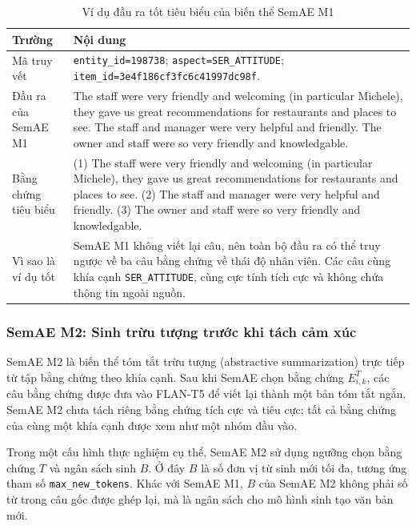 \begin{table}[H]
\centering
\caption{Ví dụ đầu ra tốt tiêu biểu của biến thể SemAE M1}
\label{tab:m1-best-example}
\footnotesize
\setlength{\tabcolsep}{5pt}
\renewcommand{\arraystretch}{1.18}
\begin{tabularx}{\textwidth}{L{0.22\textwidth} Y}
\toprule
\textbf{Trường} & \textbf{Nội dung} \\
\midrule
Mã truy vết & \texttt{entity\_id=198738}; \texttt{aspect=SER\_ATTITUDE}; \texttt{item\_id=3e4f186cf3fc6c41997dc98f}. \\
Đầu ra của SemAE M1 & The staff were very friendly and welcoming (in particular Michele), they gave us great recommendations for restaurants and places to see. The staff and manager were very helpful and friendly. The owner and staff were so very friendly and knowledgable. \\
Bằng chứng tiêu biểu & (1) The staff were very friendly and welcoming (in particular Michele), they gave us great recommendations for restaurants and places to see. (2) The staff and manager were very helpful and friendly. (3) The owner and staff were so very friendly and knowledgable. \\
Vì sao là ví dụ tốt & SemAE M1 không viết lại câu, nên toàn bộ đầu ra có thể truy ngược về ba câu bằng chứng về thái độ nhân viên. Các câu cùng khía cạnh \texttt{SER\_ATTITUDE}, cùng cực tính tích cực và không chứa thông tin ngoài nguồn. \\
\bottomrule
\end{tabularx}
\end{table}

\subsubsection{SemAE M2: Sinh trừu tượng trước khi tách cảm xúc}
\label{subsec:method2-m2}

SemAE M2 là biến thể tóm tắt trừu tượng (abstractive summarization) trực tiếp từ tập bằng chứng theo khía cạnh. Sau khi SemAE chọn bằng chứng \(E_{i,k}^{T}\), các câu bằng chứng được đưa vào FLAN-T5 để viết lại thành một bản tóm tắt ngắn. SemAE M2 chưa tách riêng bằng chứng tích cực và tiêu cực; tất cả bằng chứng của cùng một khía cạnh được xem như một nhóm đầu vào.

Trong một cấu hình thực nghiệm cụ thể, SemAE M2 sử dụng ngưỡng chọn bằng chứng \(T\) và ngân sách sinh \(B\). Ở đây \(B\) là số đơn vị từ sinh mới tối đa, tương ứng tham số \texttt{max\_new\_tokens}. Khác với SemAE M1, \(B\) của SemAE M2 không phải số từ trong câu gốc được ghép lại, mà là ngân sách cho mô hình sinh tạo văn bản mới.

